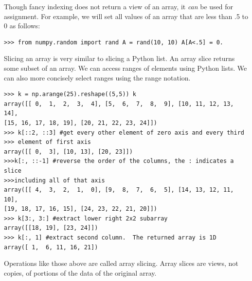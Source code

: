 Though fancy indexing does not return a view of an array, it \emph{can}
be used for assignment. For example, we will set all values of an array
that are less than .5 to 0 as follows: \begin{lstlisting}
>>> from numpy.random import rand A = rand(10, 10) A[A<.5] = 0.
\end{lstlisting}

Slicing an array is very similar to slicing a Python list. An array
slice returns some subset of an array. We can access ranges of elements
using Python lists. We can also more concisely select ranges using the
 range notation. \begin{lstlisting}
>>> k = np.arange(25).reshape((5,5)) k
array([[ 0,  1,  2,  3,  4], [5,  6,  7,  8,  9], [10, 11, 12, 13, 14],
[15, 16, 17, 18, 19], [20, 21, 22, 23, 24]])
>>> k[::2, ::3] #get every other element of zero axis and every third
>>> element of first axis
array([[ 0,  3], [10, 13], [20, 23]])
>>>k[:, ::-1] #reverse the order of the columns, the : indicates a slice
>>>including all of that axis
array([[ 4,  3,  2,  1,  0], [9,  8,  7,  6,  5], [14, 13, 12, 11, 10],
[19, 18, 17, 16, 15], [24, 23, 22, 21, 20]])
>>> k[3:, 3:] #extract lower right 2x2 subarray
array([[18, 19], [23, 24]])
>>> k[:, 1] #extract second column.  The returned array is 1D
array([ 1,  6, 11, 16, 21]) \end{lstlisting} Operations like those above
are called array slicing. Array slices are views, not copies, of
portions of the data of the original array.

% 

